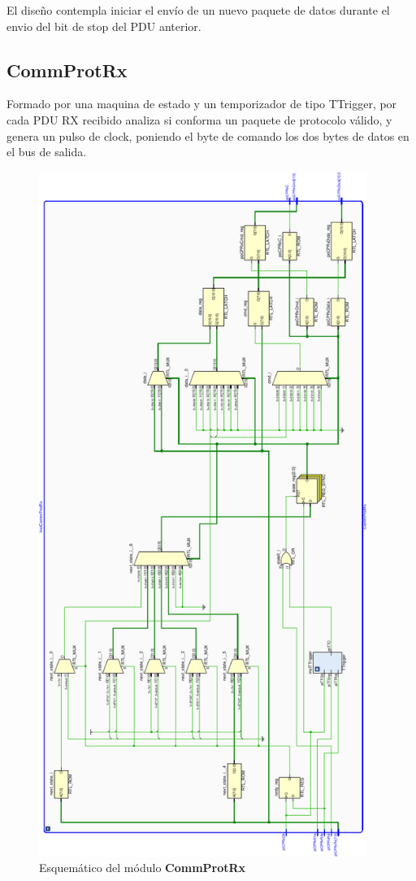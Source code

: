 \documentclass[12pt]{article}
\begin{document}
El diseño contempla iniciar el envío de un nuevo paquete de datos durante el envio del bit de stop del PDU anterior.

\subsection{CommProtRx}
Formado por una maquina de estado y un temporizador de tipo TTrigger, por cada PDU RX recibido analiza si conforma un paquete de protocolo válido, y genera un pulso de clock, poniendo el byte de comando los dos bytes de datos en el bus de salida.

\begin{figure}[H]
    \centering
    \includegraphics[angle=270, width=0.95\textwidth]{CommProtRx-crop}
    \caption{Esquemático del módulo \textbf{CommProtRx}}
\end{figure}
\end{document}
